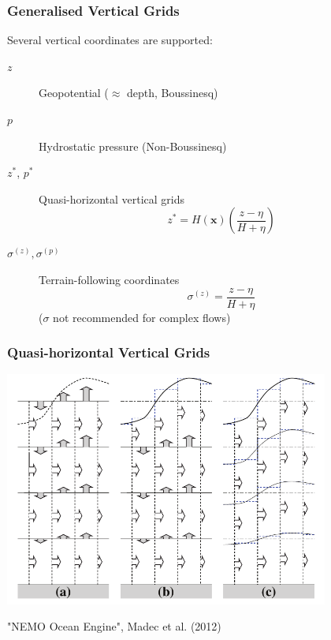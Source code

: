 \documentclass[red]{beamer}
\begin{document}
\begin{frame}
    \frametitle{Generalised Vertical Grids}
    
    Several vertical coordinates are supported:
    \begin{description}
        \item[$z$] Geopotential ($\approx$ depth, Boussinesq)
        
        \item[$p$] Hydrostatic pressure (Non-Boussinesq)
        
        \item[$z^*$, $p^*$] Quasi-horizontal vertical grids
            $$
            z^* = H(\mathbf{x}) \left(\frac{z - \eta}{H + \eta}\right)
            $$
        \item[$\sigma^{(z)}, \sigma^{(p)}$] Terrain-following coordinates
            $$
            \sigma^{(z)} = \frac{z - \eta}{H + \eta}
            $$
            ($\sigma$ not recommended for complex flows)
    \end{description}
\end{frame}

\begin{frame}
    \frametitle{Quasi-horizontal Vertical Grids}
    
    \begin{center}
        \includegraphics[width=0.8\textwidth]{zstar.pdf}
    \end{center}
    
    {\tiny "NEMO Ocean Engine", Madec et al. (2012)}
\end{frame}
\end{document}
